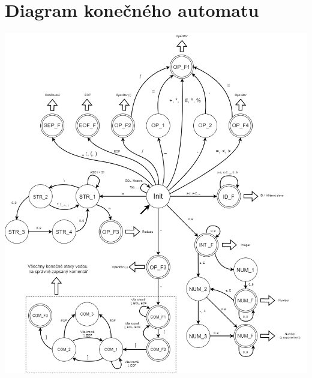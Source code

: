 \documentclass[11pt]{article}
\begin{document}
	
    
    
    \section{Diagram konečného automatu}
        \includegraphics[width=1\linewidth]{FSM.png}
        \pagebreak
    
    
\end{document}
